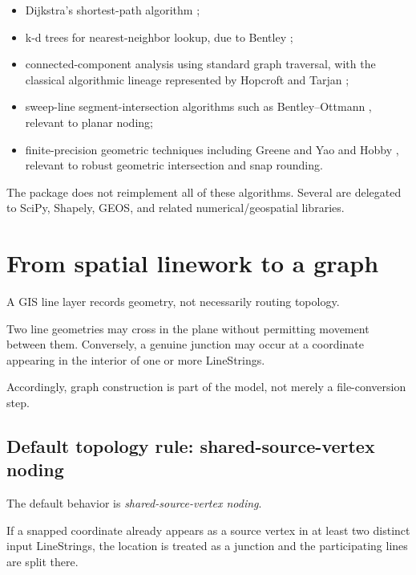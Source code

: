 \documentclass[11pt]{article}
\begin{document}
\begin{itemize}[leftmargin=1.5em]

\item Dijkstra's shortest-path algorithm \cite{Dijkstra1959};

\item k-d trees for nearest-neighbor lookup, due to Bentley
\cite{Bentley1975};

\item connected-component analysis using standard graph traversal, with the
classical algorithmic lineage represented by Hopcroft and Tarjan
\cite{HopcroftTarjan1973};

\item sweep-line segment-intersection algorithms such as Bentley--Ottmann
\cite{BentleyOttmann1979}, relevant to planar noding;

\item finite-precision geometric techniques including Greene and Yao
\cite{GreeneYao1986} and Hobby \cite{Hobby1999}, relevant to robust geometric
intersection and snap rounding.

\end{itemize}

The package does not reimplement all of these algorithms. Several are delegated
to SciPy, Shapely, GEOS, and related numerical/geospatial libraries.

\section{From spatial linework to a graph}

A GIS line layer records geometry, not necessarily routing topology.

Two line geometries may cross in the plane without permitting movement between
them. Conversely, a genuine junction may occur at a coordinate appearing in
the interior of one or more LineStrings.

Accordingly, graph construction is part of the model, not merely a
file-conversion step.

\subsection{Default topology rule: shared-source-vertex noding}

The default behavior is \emph{shared-source-vertex noding}.

If a snapped coordinate already appears as a source vertex in at least two
distinct input LineStrings, the location is treated as a junction and the
participating lines are split there.
\end{document}
